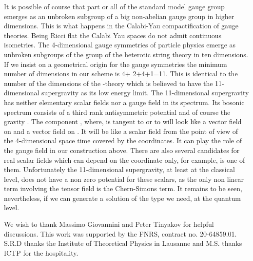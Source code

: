 \documentclass[a4paper,12pt]{article}
\begin{document}
It is possible of course that part or all of the standard model gauge
group emerges as an unbroken subgroup of a big non-abelian gauge
group in higher dimensions. This is what happens in the Calabi-Yau
compactification of gauge theories. Being Ricci flat the Calabi Yau
spaces do not admit continuous isometries. The 4-dimensional gauge
symmetries of particle physics emerge as unbroken subgroups of the
\coordHE{} group of the heterotic string theory in ten
dimensions. If we insist on a geometrical origin for the gauge
symmetries the minimum number of dimensions in our scheme is 4+
2+4+1=11. This is identical to the number of the dimensions of the
\coordHE{}-theory which is believed to have the 11-dimensional supergravity
as its low energy limit. The 11-dimensional supergravity has
neither elementary scalar fields  nor a \coordHE{} gauge field in its
spectrum. Its bosonic spectrum consists of a third rank antisymmetric
potential \coordHE{} and of course the gravity \coordHE{}. The component
\coordHE{}, where, \coordHE{} is tangent to \coordHE{} or to \coordHE{} will look
like a vector field on \coordHE{} and a vector field on \coordHE{}. It will be
like a scalar field from the point of view of the 4-dimensional space
time covered by the \coordHE{} coordinates. It can play the role of the
\coordHE{} gauge field in our construction above.  There are also several
candidates for real scalar fields which can depend on the \coordHE{}
coordinate only, for example, \coordHE{} is one of them.
Unfortunately the 11-dimensional supergravity, at least at the
classical level,  does not have  a non zero potential for these
scalars, as the only non linear term involving the tensor field
\coordHE{} is the Chern-Simons term.  It remains to be seen,
nevertheless, if we can generate a solution of the type we need, at
the quantum level.


We wish to thank Massimo Giovannini and Peter Tinyakov for helpful
discussions. This work was supported by the FNRS, contract no.
20-64859.01. S.R.D thanks the Institute of Theoretical
Physics in Lausanne and M.S. thanks ICTP for the hospitality.
\end{document}
